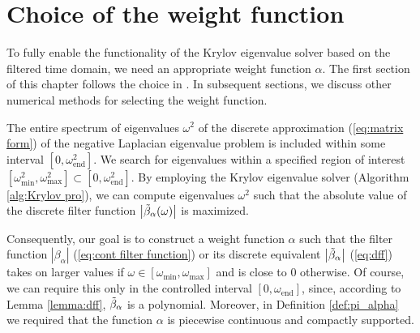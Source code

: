 \documentclass[a4paper,11pt,bibliography=totoc,listof=totoc,headinclude=true,cleardoublepage=empty,oneside]{scrbook}
\newcommand{\dff}{\Tilde{\beta}_\alpha}
\newcommand{\e}{\mathrm{end}}
\renewcommand{\eqref}[1]{(\ref{#1})}
\begin{document}
\chapter{Choice of the weight function}
\label{chapter:function}
To fully enable the functionality of the Krylov eigenvalue solver based on the filtered time domain, we need an appropriate weight function $\alpha$. The first section of this chapter follows the choice in \cite{nannen}. In subsequent sections, we discuss other numerical methods for selecting the weight function.

The entire spectrum of eigenvalues $\omega^2$ of the discrete approximation \eqref{eq:matrix form} of the negative Laplacian eigenvalue problem is included within some interval $\left[0, \omega_\e^2\right]$. We search for eigenvalues within a specified region of interest $\left[\omega_{\min}^2, \omega_{\max}^2\right] \subset \left[0, \omega_\e^2\right]$. By employing the Krylov eigenvalue solver (Algorithm \ref{alg:Krylov pro}), we can compute eigenvalues $\omega^2$ such that the absolute value of the discrete filter function $\left|\dff(\omega)\right|$ is maximized.

Consequently, our goal is to construct a weight function $\alpha$ such that the filter function $\left|\beta_\alpha\right|$ \eqref{eq:cont filter function} or its discrete equivalent $\left|\dff\right|$ \eqref{eq:dff} takes on larger values if $\omega \in \left[\omega_{\min}, \omega_{\max} \right]$ and is close to 0 otherwise. Of course, we can require this only in the controlled interval $\left[0, \omega_\e\right]$, since, according to Lemma \ref{lemma:dff}, $\dff$ is a polynomial. Moreover, in Definition \ref{def:pi_alpha} we required that the function $\alpha$ is piecewise continuous and compactly supported.
\end{document}
